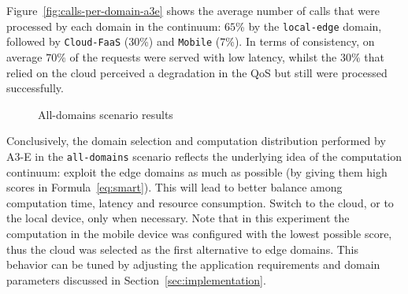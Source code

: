 Figure~\ref{fig:calls-per-domain-a3e} shows the average number of calls that were processed by each domain in the continuum: $65$\% by the \texttt{local-edge} domain, followed by \texttt{Cloud-FaaS} ($30$\%) and \texttt{Mobile} ($7$\%). In terms of consistency, on average $70\%$ of the requests were served with low latency, whilst the $30\%$ that relied on the cloud perceived a degradation in the QoS but still were processed successfully.
 
\begin{figure}[htb]
	\raggedright

	\captionsetup[subfigure]{width=0.45\textwidth}
	\captionsetup[subfigure]{width=0.45\textwidth}
	
	\caption{All-domains scenario results} \label{fig:all-domains}
\end{figure}

Conclusively, the domain selection and computation distribution performed by A3-E in the \texttt{all-domains} scenario reflects the underlying idea of the computation continuum: exploit the edge domains as much as possible (by giving them high scores in Formula~\ref{eq:smart}). This will lead to better balance among computation time, latency and resource consumption. Switch to the cloud, or to the local device, only when necessary. Note that in this experiment the computation in the mobile device was configured with the lowest possible score, thus the cloud was selected as the first alternative to edge domains. This behavior can be tuned by adjusting the application requirements and domain parameters discussed in Section~\ref{sec:implementation}.


